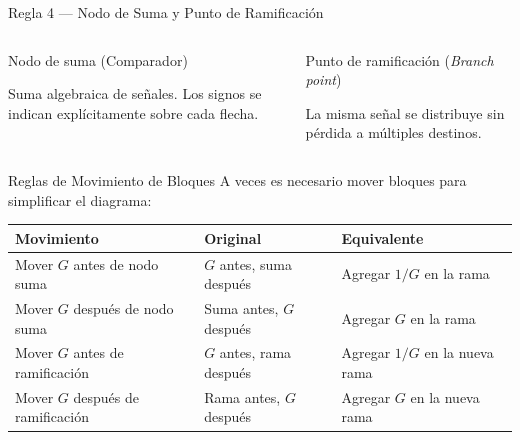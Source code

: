 \documentclass[aspectratio=169,xcolor=dvipsnames]{beamer}
\begin{document}
\begin{frame}{Regla 4 --- Nodo de Suma y Punto de Ramificaci\'on}
    \begin{columns}
        \begin{block}{Nodo de suma (Comparador)}
            \begin{center}
            \end{center}
            Suma algebraica de se\~nales. Los signos se indican expl\'icitamente sobre cada flecha.
        \end{block}
        \begin{block}{Punto de ramificaci\'on (\textit{Branch point})}
            \begin{center}
            \end{center}
            La misma se\~nal se distribuye sin p\'erdida a m\'ultiples destinos.
        \end{block}
    \end{columns}
\end{frame}

\begin{frame}{Reglas de Movimiento de Bloques}
    A veces es necesario mover bloques para simplificar el diagrama:
    \vspace{0.3em}
    \begin{table}
        \centering
        \begin{tabular}{lll}
            \toprule
            \textbf{Movimiento} & \textbf{Original} & \textbf{Equivalente} \\
            \midrule
            Mover $G$ antes de nodo suma & $G$ antes, suma despu\'es & Agregar $1/G$ en la rama \\
            Mover $G$ despu\'es de nodo suma & Suma antes, $G$ despu\'es & Agregar $G$ en la rama \\
            Mover $G$ antes de ramificaci\'on & $G$ antes, rama despu\'es & Agregar $1/G$ en la nueva rama \\
            Mover $G$ despu\'es de ramificaci\'on & Rama antes, $G$ despu\'es & Agregar $G$ en la nueva rama \\
            \bottomrule
        \end{tabular}
    \end{table}
\end{frame}
\end{document}
